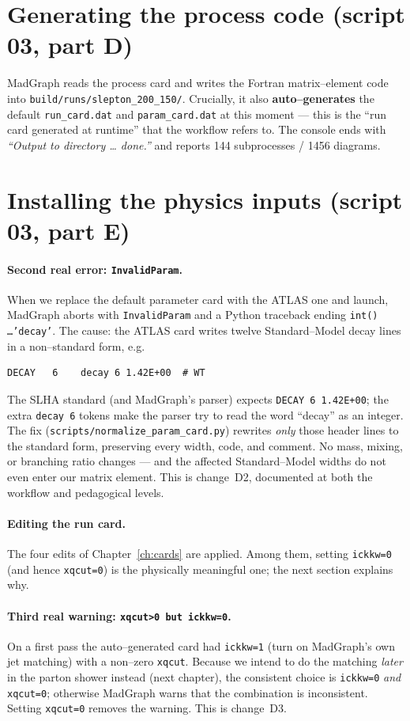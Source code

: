 \documentclass[11pt,oneside]{report}
\newcommand{\code}[1]{\texttt{#1}}
\begin{document}
\section{Generating the process code (script 03, part D)}
MadGraph reads the process card and writes the Fortran matrix--element code into
\code{build/runs/slepton\_200\_150/}. Crucially, it also \textbf{auto--generates} the default
\code{run\_card.dat} and \code{param\_card.dat} at this moment --- this is the ``run card generated
at runtime'' that the workflow refers to. The console ends with \emph{``Output to directory \dots
done.''} and reports 144 subprocesses / 1456 diagrams.

\section{Installing the physics inputs (script 03, part E)}
\paragraph{Second real error: \code{InvalidParam}.}\label{sec:slha-fix}
When we replace the default parameter card with the ATLAS one and launch, MadGraph aborts with
\code{InvalidParam} and a Python traceback ending \code{int() \dots 'decay'}. The cause: the ATLAS
card writes twelve Standard--Model decay lines in a non--standard form, e.g.
\begin{lstlisting}[style=card]
DECAY   6    decay 6 1.42E+00  # WT
\end{lstlisting}
The SLHA standard (and MadGraph's parser) expects \code{DECAY 6 1.42E+00}; the extra
\code{decay 6} tokens make the parser try to read the word ``decay'' as an integer. The fix
(\code{scripts/normalize\_param\_card.py}) rewrites \emph{only} those header lines to the standard
form, preserving every width, code, and comment. No mass, mixing, or branching ratio changes ---
and the affected Standard--Model widths do not even enter our matrix element. This is change~D2,
documented at both the workflow and pedagogical levels.

\paragraph{Editing the run card.} The four edits of Chapter~\ref{ch:cards} are applied. Among them,
setting \code{ickkw=0} (and hence \code{xqcut=0}) is the physically meaningful one; the next
section explains why.

\paragraph{Third real warning: \code{xqcut>0 but ickkw=0}.} On a first pass the auto--generated card
had \code{ickkw=1} (turn on MadGraph's own jet matching) with a non--zero \code{xqcut}. Because we
intend to do the matching \emph{later} in the parton shower instead (next chapter), the consistent
choice is \code{ickkw=0} \emph{and} \code{xqcut=0}; otherwise MadGraph warns that the combination is
inconsistent. Setting \code{xqcut=0} removes the warning. This is change~D3.
\end{document}
